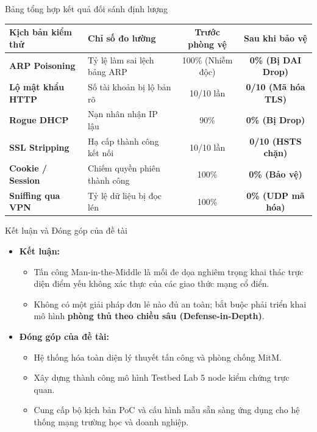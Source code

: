 \documentclass[fleqn]{beamer}
\begin{document}
\begin{frame}{Bảng tổng hợp kết quả đối sánh định lượng}
  \begin{table}[htbp]
    \centering
    \footnotesize
    \begin{tabularx}{\textwidth}{l L c c}
      \toprule
      \textbf{Kịch bản kiểm thử} & \textbf{Chỉ số đo lường} & \textbf{Trước phòng vệ} & \textbf{Sau khi bảo vệ} \\
      \midrule
      \textbf{ARP Poisoning} & Tỷ lệ làm sai lệch bảng ARP & 100\% (Nhiễm độc) & \textbf{0\% (Bị DAI Drop)} \\
      \textbf{Lộ mật khẩu HTTP} & Số tài khoản bị lộ bản rõ & 10/10 lần & \textbf{0/10 (Mã hóa TLS)} \\
      \textbf{Rogue DHCP} & Nạn nhân nhận IP lậu & 90\% & \textbf{0\% (Bị Drop)} \\
      \textbf{SSL Stripping} & Hạ cấp thành công kết nối & 10/10 lần & \textbf{0/10 (HSTS chặn)} \\
      \textbf{Cookie / Session} & Chiếm quyền phiên thành công & 100\% & \textbf{0\% (Bảo vệ)} \\
      \textbf{Sniffing qua VPN} & Tỷ lệ dữ liệu bị đọc lén & 100\% & \textbf{0\% (UDP mã hóa)} \\
      \bottomrule
    \end{tabularx}
  \end{table}
\end{frame}

\begin{frame}{Kết luận và Đóng góp của đề tài}
  \begin{itemize}
    \item \textbf{Kết luận:}
      \begin{itemize}
        \item Tấn công Man-in-the-Middle là mối đe dọa nghiêm trọng khai thác trực diện điểm yếu không xác thực của các giao thức mạng cổ điển.
        \item Không có một giải pháp đơn lẻ nào đủ an toàn; bắt buộc phải triển khai mô hình \textbf{phòng thủ theo chiều sâu (Defense-in-Depth)}.
      \end{itemize}
    \item \textbf{Đóng góp của đề tài:}
      \begin{itemize}
        \item Hệ thống hóa toàn diện lý thuyết tấn công và phòng chống MitM.
        \item Xây dựng thành công mô hình Testbed Lab 5 node kiểm chứng trực quan.
        \item Cung cấp bộ kịch bản PoC và cấu hình mẫu sẵn sàng ứng dụng cho hệ thống mạng trường học và doanh nghiệp.
      \end{itemize}
  \end{itemize}
\end{frame}
\end{document}
